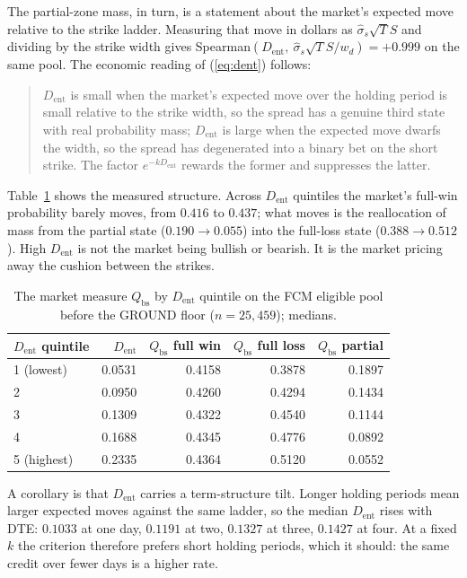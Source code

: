 \documentclass[11pt]{article}
\newcommand{\dent}{D_{\mathrm{ent}}}
\newcommand{\Qbs}{Q_{\mathrm{bs}}}
\begin{document}
The partial-zone mass, in turn, is a statement about the market's expected
move relative to the strike ladder. Measuring that move in dollars as
$\hat\sigma_s \sqrt{T} S$ and dividing by the strike width gives
Spearman$(\dent,\ \hat\sigma_s\sqrt{T}S/w_d) = +0.999$ on the same pool. The
economic reading of (\ref{eq:dent}) follows:

\begin{quote}
$\dent$ is small when the market's expected move over the holding period is
small relative to the strike width, so the spread has a genuine third state
with real probability mass; $\dent$ is large when the expected move dwarfs the
width, so the spread has degenerated into a binary bet on the short strike.
The factor $e^{-k\dent}$ rewards the former and suppresses the latter.
\end{quote}

Table~\ref{tab:dentquint} shows the measured structure. Across $\dent$
quintiles the market's full-win probability barely moves, from $0.416$ to
$0.437$; what moves is the reallocation of mass from the partial state
($0.190 \to 0.055$) into the full-loss state ($0.388 \to 0.512$). High $\dent$
is not the market being bullish or bearish. It is the market pricing away the
cushion between the strikes.

\begin{table}[h]
\centering
\caption{The market measure $\Qbs$ by $\dent$ quintile on the FCM eligible
pool before the GROUND floor ($n = 25{,}459$); medians.}
\label{tab:dentquint}
\begin{tabular}{lrrrr}
\toprule
$\dent$ quintile & $\dent$ & $\Qbs$ full win & $\Qbs$ full loss & $\Qbs$ partial \\
\midrule
1 (lowest) & 0.0531 & 0.4158 & 0.3878 & 0.1897 \\
2          & 0.0950 & 0.4260 & 0.4294 & 0.1434 \\
3          & 0.1309 & 0.4322 & 0.4540 & 0.1144 \\
4          & 0.1688 & 0.4345 & 0.4776 & 0.0892 \\
5 (highest)& 0.2335 & 0.4364 & 0.5120 & 0.0552 \\
\bottomrule
\end{tabular}
\end{table}

A corollary is that $\dent$ carries a term-structure tilt. Longer holding
periods mean larger expected moves against the same ladder, so the median
$\dent$ rises with DTE: $0.1033$ at one day, $0.1191$ at two, $0.1327$ at
three, $0.1427$ at four. At a fixed $k$ the criterion therefore prefers short
holding periods, which it should: the same credit over fewer days is a higher
rate.
\end{document}

